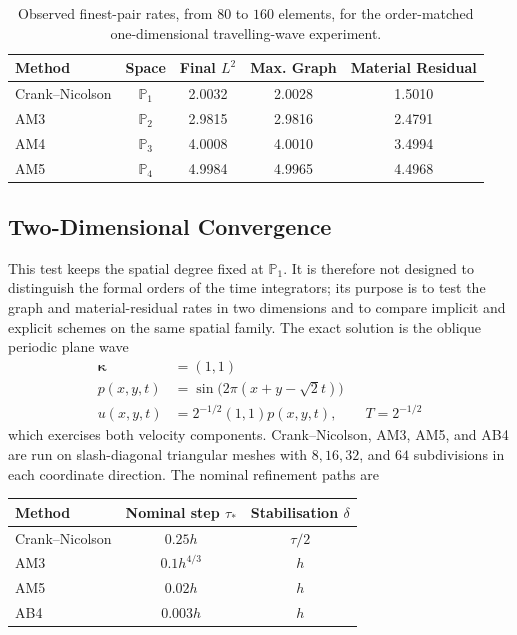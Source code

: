 \documentclass[11pt]{article}
\begin{document}
\begin{table}[htbp]
\centering
\begin{tabular}{lcccc}
\toprule
Method & Space & Final \(L^2\) & Max. Graph & Material Residual \\
\midrule
Crank--Nicolson & \(\mathbb P_1\) & 2.0032 & 2.0028 & 1.5010 \\
AM3 & \(\mathbb P_2\) & 2.9815 & 2.9816 & 2.4791 \\
AM4 & \(\mathbb P_3\) & 4.0008 & 4.0010 & 3.4994 \\
AM5 & \(\mathbb P_4\) & 4.9984 & 4.9965 & 4.4968 \\
\bottomrule
\end{tabular}
\caption{Observed finest-pair rates, from \(80\) to \(160\) elements, for
the order-matched one-dimensional travelling-wave experiment.}
\label{tab:numerical-one-dimensional-rates}
\end{table}


\subsection{Two-Dimensional Convergence}
\label{subsec:numerical-two-dimensional-convergence}
This test keeps the spatial degree fixed at \(\mathbb P_1\). It is therefore not
designed to distinguish the formal orders of the time integrators; its purpose
is to test the graph and material-residual rates in two dimensions and to
compare implicit and explicit schemes on the same spatial family. The exact
solution is the oblique periodic plane wave
\begin{align}
\boldsymbol{\kappa}&=(1,1) \label{eq:numerical-plane-wave-vector}\\
p(x,y,t)&=\sin\bigl(2\pi(x+y-\sqrt{2}t)\bigr)
\label{eq:numerical-plane-wave-pressure}\\
u(x,y,t)&=2^{-1/2}(1,1)p(x,y,t),\qquad T=2^{-1/2}
\label{eq:numerical-plane-wave-velocity}
\end{align}
which exercises both velocity components. Crank--Nicolson, AM3, AM5, and
AB4 are run on slash-diagonal triangular meshes with \(8,16,32\), and \(64\)
subdivisions in each coordinate direction. The nominal refinement paths are
\begin{center}
\begin{tabular}{lcc}
\toprule
Method & Nominal step \(\tau_*\) & Stabilisation \(\delta\) \\
\midrule
Crank--Nicolson & \(0.25h\) & \(\tau/2\) \\
AM3 & \(0.1h^{4/3}\) & \(h\) \\
AM5 & \(0.02h\) & \(h\) \\
AB4 & \(0.003h\) & \(h\) \\
\bottomrule
\end{tabular}
\end{center}
\end{document}
